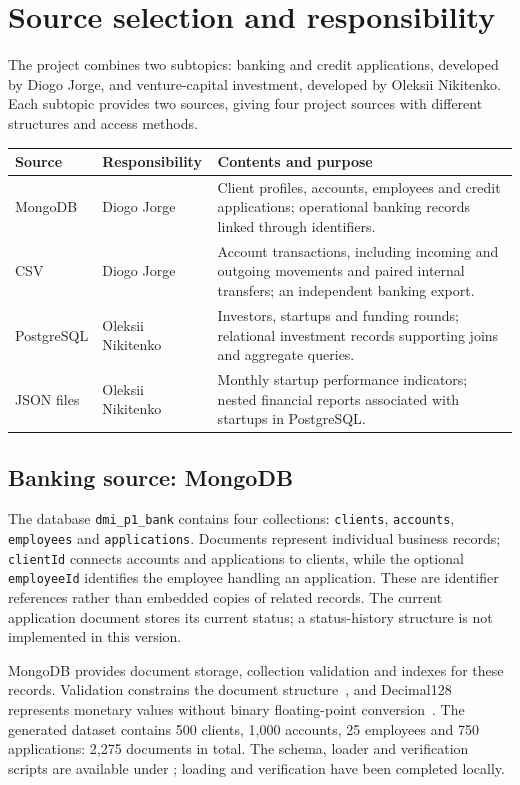 \documentclass[11pt,a4paper]{article}
\begin{document}
\section{Source selection and responsibility}
The project combines two subtopics: banking and credit applications, developed
by Diogo Jorge, and venture-capital investment, developed by Oleksii Nikitenko.
Each subtopic provides two sources, giving four project sources with different
structures and access methods.

\begingroup
\renewcommand{\arraystretch}{1.2}
\begin{tabularx}{\textwidth}{@{}p{2.2cm} p{2.7cm} >{\raggedright\arraybackslash}X@{}}
\toprule
Source & Responsibility & Contents and purpose\\\midrule
MongoDB & Diogo Jorge & Client profiles, accounts, employees and credit
applications; operational banking records linked through identifiers.\\
CSV & Diogo Jorge & Account transactions, including incoming and outgoing
movements and paired internal transfers; an independent banking export.\\
PostgreSQL & Oleksii Nikitenko & Investors, startups and funding rounds;
relational investment records supporting joins and aggregate queries.\\
JSON files & Oleksii Nikitenko & Monthly startup performance indicators;
nested financial reports associated with startups in PostgreSQL.\\
\bottomrule
\end{tabularx}
\endgroup

\subsection{Banking source: MongoDB}
The database \texttt{dmi\_p1\_bank} contains four collections:
\texttt{clients}, \texttt{accounts}, \texttt{employees} and
\texttt{applications}. Documents represent individual business records;
\texttt{clientId} connects accounts and applications to clients, while the
optional \texttt{employeeId} identifies the employee handling an application.
These are identifier references rather than embedded copies of related records.
The current application document stores its current status; a status-history
structure is not implemented in this version.

MongoDB provides document storage, collection validation and indexes for these
records. Validation constrains the document structure~\cite{validation}, and
Decimal128 represents monetary values without binary floating-point
conversion~\cite{decimal}. The generated dataset contains 500 clients,
1,000 accounts, 25 employees and 750 applications: 2,275 documents in total.
The schema, loader and verification scripts are available under
; loading and verification have been completed locally.
\end{document}

